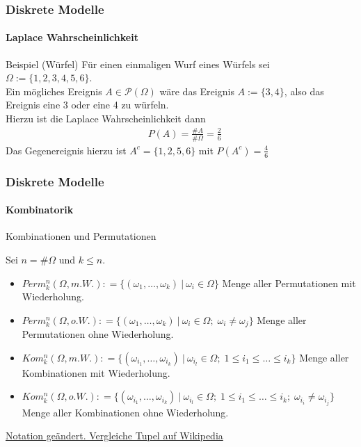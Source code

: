 \documentclass{beamer}
\begin{document}
 \begin{frame}
    \frametitle{Diskrete Modelle}
\framesubtitle{ Laplace Wahrscheinlichkeit}

\begin{block}{Beispiel (Würfel)}
Für einen einmaligen Wurf eines Würfels sei $\Omega := \{1,2,3,4,5,6\}$. \\
Ein mögliches Ereignis $A \in \mathcal{P}(\Omega)$ wäre das Ereignis $A := \{3,4\}$, also das Ereignis eine 3 oder eine 4 zu würfeln.  \\
Hierzu ist die Laplace Wahrscheinlichkeit dann 
\begin{align*}
& P(A) = \frac{ \#A}{ \# \Omega} = \frac{2}{6}
\end{align*}
Das Gegenereignis hierzu ist $A^c = \{1,2,5,6\}$ mit $P(A^c) = \frac{4}{6}$
\end{block}

 \end{frame}



\begin{frame}
    \frametitle{Diskrete Modelle}
\framesubtitle{Kombinatorik}
\begin{block}{Kombinationen und Permutationen}

Sei $n = \#\Omega$ und $k \leq n$.
\begin{itemize}
\item $Perm_k^n(\Omega, m.W.) : = \{ ( \omega_1, \ldots, \omega_k) \ |\  \omega_i \in \Omega \}$  Menge aller Permutationen mit Wiederholung.
\item $Perm_k^n(\Omega, o.W.) : = \{ ( \omega_1, \ldots, \omega_k) \ |\  \omega_i \in \Omega; \;  \omega_i \neq \omega_j  \}$  Menge aller Permutationen ohne Wiederholung.
\item $Kom_k^n(\Omega, m.W.) : = \{ ( \omega_{i_1}, \ldots, \omega_{i_k})  \ |\  \omega_{i_l} \in \Omega; \; 1  \leq i_1 \leq  \ldots  \leq i_k  \}$  Menge aller Kombinationen  mit Wiederholung.
\item $Kom_k^n(\Omega, o.W.) : = \{ ( \omega_{i_1}, \ldots, \omega_{i_k} ) \ |\  \omega_{i_l} \in \Omega; \; 1 \leq i_1  \leq \ldots \leq i_k; \;  \omega_{i_i} \neq \omega_{i_j} \} $  Menge aller Kombinationen  ohne  Wiederholung.
\end{itemize}
\href{https://de.wikipedia.org/wiki/Tupel}{Notation geändert. Vergleiche Tupel auf Wikipedia}
\end{block}

 \end{frame}
 
\end{document}
